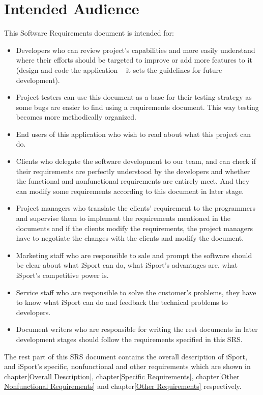 \documentclass[16pt]{scrreprt}
\begin{document}
\section{Intended Audience}
This Software Requirements document is intended for:
\begin{itemize}
    \item Developers who can review project’s capabilities and more easily understand where their efforts should be targeted to improve or add more features to it (design and code the application – it sets the guidelines for future development).
    \item Project testers can use this document as a base for their testing strategy as some bugs are easier to find using a requirements document. This way testing becomes more methodically organized.
   \item End users of this application who wish to read about what this project can do.
   \item Clients who delegate the software development to our team, and can check if their requirements are perfectly understood by the developers and whether the functional and nonfunctional requirements are entirely meet. And they can modify some requirements according to this document in later stage. 
   \item Project managers who translate the clients' requirement to the programmers and supervise them to implement the requirements mentioned in the documents and if the clients modify the requirements, the project managers have to negotiate the changes with the clients and modify the document.
   \item Marketing staff who are responsible to sale and prompt the software should be clear about what iSport can do, what iSport's advantages are, what iSport's competitive power is.
   \item Service staff who are responsible to solve the customer's problems, they have to know what iSport can do and feedback the technical problems to developers.
   \item Document writers who are responsible for writing the rest documents in later development stages should follow the requirements specified in this SRS.
\end{itemize}
The rest part of this SRS document contains the overall description of iSport, and iSport's specific, nonfunctional and other requirements which are shown in chapter\ref{Overall Description}, chapter\ref{Specific Requirements}, chapter\ref{Other Nonfunctional Requirements} and chapter\ref{Other Requirements} respectively.
\end{document}
